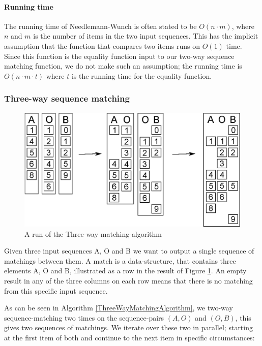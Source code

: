 \documentclass[11pt]{article}
\begin{document}
\paragraph{Running time} The running time of Needlemann-Wunch is often stated to be $O(n \cdot m)$, where $n$ and $m$ is the number of items in the two input sequences. This has the implicit assumption that the function that compares two items runs on $O(1)$ time. Since this function is the equality function input to our two-way sequence matching function, we do not make such an assumption; the running time is $O(n \cdot m \cdot t)$ where $t$ is the running time for the equality function.

\subsubsection{Three-way sequence matching}
\begin{figure}
   \centerline{\includegraphics[scale=0.6]{drawings/eps/threewaymatching.eps}}
   \caption{A run of the Three-way matching-algorithm}
   \label{ThreewayMatching}
\end{figure}

Given three input sequences A, O and B we want to output a single sequence of matchings between them. A match is a data-structure, that contains three elements A, O and B, illustrated as a row in the result of Figure \ref{ThreewayMatching}. An empty result in any of the three columns on each row means that there is no matching from this specific input sequence.

As can be seen in Algorithm \ref{ThreeWayMatchingAlgorithm}, we two-way sequence-matching two times on the sequence-pairs $(A, O)$ and $(O, B)$, this gives two sequences of matchings.  We iterate over these two in parallel; starting at the first item of both and continue to the next item in specific circumstances:
\end{document}
